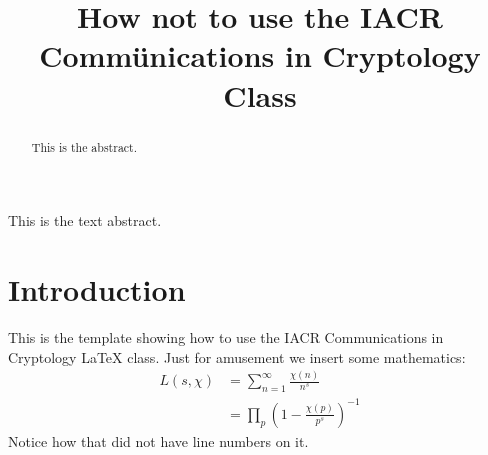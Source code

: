 \documentclass[version=final]{iacrcc}
\title[running  = {The iacrcc class},
       subtitle = {A Template}
      ]{How not to use the IACR Comm\"unications in Cryptology Class}
\begin{document}
\maketitle

\begin{abstract}
This is the abstract.
\end{abstract}
\begin{textabstract}
This is the text abstract.
\end{textabstract}

\section{Introduction}
This is the template showing how to use the IACR Communications in Cryptology \LaTeX{} class.
Just for amusement we insert some mathematics:
\begin{equation*}
  \begin{split}
    L(s, \chi) & = \sum_{n=1}^{\infty}\frac{\chi(n)}{n^s} \\
    & = \prod_{p} \left(1-\frac{\chi(p)}{p^s}\right)^{-1}
  \end{split}
\end{equation*}
Notice how that did not have line numbers on it.

\lipsum[2-8]
\cite{*}

\end{document}
